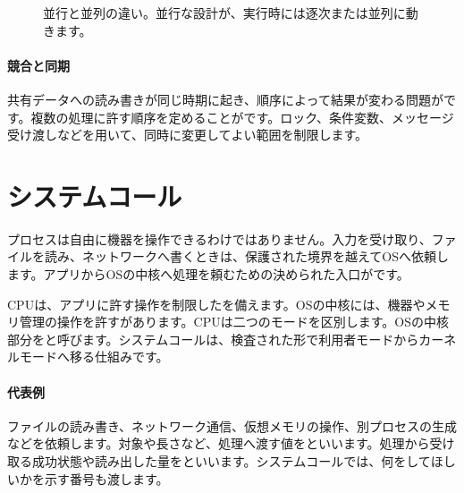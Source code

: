 \begin{figure}[htbp]
  \centering
  \caption{並行と並列の違い。並行な設計が、実行時には逐次または並列に動きます。}
  \label{fig:concurrency-parallelism}
\end{figure}

\paragraph{競合と同期}
共有データへの読み書きが同じ時期に起き、順序によって結果が変わる問題がです。複数の処理に許す順序を定めることがです。ロック、条件変数、メッセージ受け渡しなどを用いて、同時に変更してよい範囲を制限します。




\section{システムコール}
\label{sec:03-runtime-data-03}

プロセスは自由に機器を操作できるわけではありません。入力を受け取り、ファイルを読み、ネットワークへ書くときは、保護された境界を越えてOSへ依頼します。アプリからOSの中核へ処理を頼むための決められた入口がです。

CPUは、アプリに許す操作を制限したを備えます。OSの中核には、機器やメモリ管理の操作を許すがあります。CPUは二つのモードを区別します。OSの中核部分をと呼びます。システムコールは、検査された形で利用者モードからカーネルモードへ移る仕組みです。

\begingroup
\begingroup
      \centering
\par
\endgroup
\medskip
\begingroup
\paragraph{代表例}
        ファイルの読み書き、ネットワーク通信、仮想メモリの操作、別プロセスの生成などを依頼します。対象や長さなど、処理へ渡す値をといいます。処理から受け取る成功状態や読み出した量をといいます。システムコールでは、何をしてほしいかを示す番号も渡します。

